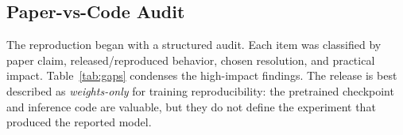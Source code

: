 \subsection{Paper-vs-Code Audit}

The reproduction began with a structured audit. Each item was classified by paper claim, released/reproduced behavior, chosen resolution, and practical impact. Table~\ref{tab:gaps} condenses the high-impact findings. The release is best described as \emph{weights-only} for training reproducibility: the pretrained checkpoint and inference code are valuable, but they do not define the experiment that produced the reported model.

